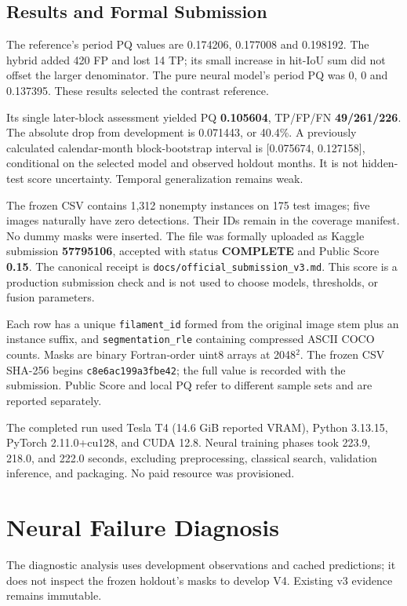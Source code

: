 \documentclass[sigconf]{acmart}
\begin{document}
\subsection{Results and Formal Submission}
The reference's period PQ values are 0.174206, 0.177008 and 0.198192. The hybrid added 420 FP and lost 14 TP; its small increase in hit-IoU sum did not offset the larger denominator. The pure neural model's period PQ was 0, 0 and 0.137395. These results selected the contrast reference.

Its single later-block assessment yielded PQ \textbf{0.105604}, TP/FP/FN \textbf{49/261/226}. The absolute drop from development is 0.071443, or 40.4\%. A previously calculated calendar-month block-bootstrap interval is [0.075674, 0.127158], conditional on the selected model and observed holdout months. It is not hidden-test score uncertainty. Temporal generalization remains weak.

The frozen CSV contains 1,312 nonempty instances on 175 test images; five images naturally have zero detections. Their IDs remain in the coverage manifest. No dummy masks were inserted. The file was formally uploaded as Kaggle submission \textbf{57795106}, accepted with status \textbf{COMPLETE} and Public Score \textbf{0.15}. The canonical receipt is \texttt{docs/official\_submission\_v3.md}. This score is a production submission check and is not used to choose models, thresholds, or fusion parameters.

Each row has a unique \texttt{filament\_id} formed from the original image stem plus an instance suffix, and \texttt{segmentation\_rle} containing compressed ASCII COCO counts. Masks are binary Fortran-order uint8 arrays at 2048$^2$. The frozen CSV SHA-256 begins \texttt{c8e6ac199a3fbe42}; the full value is recorded with the submission. Public Score and local PQ refer to different sample sets and are reported separately.

The completed run used Tesla T4 (14.6 GiB reported VRAM), Python 3.13.15, PyTorch 2.11.0+cu128, and CUDA 12.8. Neural training phases took 223.9, 218.0, and 222.0 seconds, excluding preprocessing, classical search, validation inference, and packaging. No paid resource was provisioned.

\clearpage
\section{Neural Failure Diagnosis}
The diagnostic analysis uses development observations and cached predictions; it does not inspect the frozen holdout's masks to develop V4. Existing v3 evidence remains immutable.
\end{document}
